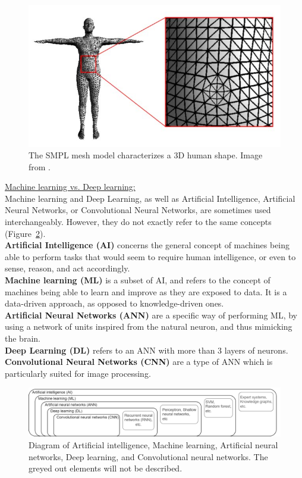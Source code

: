 \begin{figure}[hbtp]
	\centering
            \def\svgwidth{1\columnwidth}
            \fontsize{10pt}{10pt}\selectfont
            \includegraphics[width=0.6\linewidth]{"../Annexes/Figures/Mesh_model.jpg"}
            \caption{The SMPL mesh model characterizes a 3D human shape. Image from \cite{Wu2020}.}
            \label{fig_meshmodel}
\end{figure}
\FloatBarrier

\vspace*{0.5cm}

\noindent\underline{Machine learning vs. Deep learning:}\\
Machine learning and Deep Learning, as well as Artificial Intelligence, Artificial Neural Networks, or Convolutional Neural Networks, are sometimes used interchangeably. However, they do not exactly refer to the same concepts (Figure~\ref{fig_ai}).\\
\textbf{Artificial Intelligence (AI)} concerns the general concept of machines being able to perform tasks that would seem to require human intelligence, or even to sense, reason, and act accordingly. \\
\textbf{Machine learning (ML)} is a subset of AI, and refers to the concept of machines being able to learn and improve as they are exposed to data. It is a data-driven approach, as opposed to knowledge-driven ones.\\
\textbf{Artificial Neural Networks (ANN)} are a specific way of performing ML, by using a network of units inspired from the natural neuron, and thus mimicking the brain. \\
\textbf{Deep Learning (DL)} refers to an ANN with more than 3 layers of neurons.\\
\textbf{Convolutional Neural Networks (CNN)} are a type of ANN which is particularly suited for image processing.

\begin{figure}[hbtp]
	\centering
            \def\svgwidth{1\columnwidth}
            \fontsize{10pt}{10pt}\selectfont
            \includegraphics[width=\linewidth]{"../Annexes/Figures/AI_CNN_etc.png"}
            \caption{Diagram of Artificial intelligence, Machine learning, Artificial neural networks, Deep learning, and Convolutional neural networks. The greyed out elements will not be described.}
            \label{fig_ai}
\end{figure}
\FloatBarrier
\vspace*{0.5cm}


